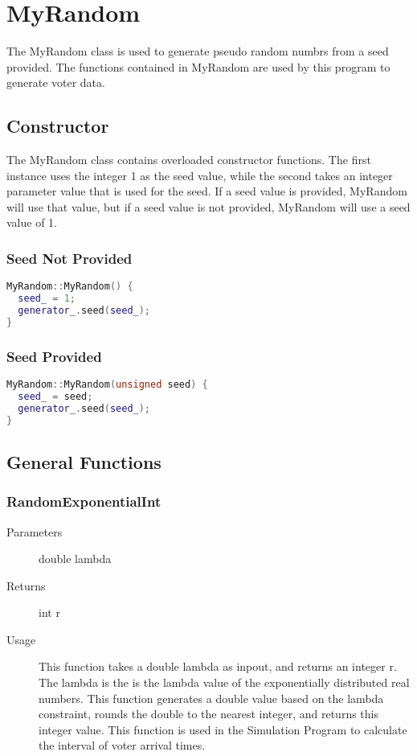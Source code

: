 %


\chapter{MyRandom}
The MyRandom class is used to generate pseudo random numbrs from a seed provided.  The functions contained in MyRandom are used by this program to generate voter data.


\section{Constructor}
The MyRandom class contains overloaded constructor functions. The first instance uses the integer 1 as the seed value, while the second takes an integer parameter value that is used for the seed. 
If a seed value is provided, MyRandom will use that value, but if a seed value is not provided, MyRandom will use a seed value of 1.

\subsection{Seed Not Provided}
\begin{lstlisting}[language=C++]
 MyRandom::MyRandom() {
  seed_ = 1;
  generator_.seed(seed_);
}
\end{lstlisting}

\subsection{Seed Provided}
\begin{lstlisting}[language=C++]
 MyRandom::MyRandom(unsigned seed) {
  seed_ = seed;
  generator_.seed(seed_);
}
\end{lstlisting}
 
\section{General Functions}

\subsection{RandomExponentialInt}
\begin{description}
\item[Parameters] double lambda
\item[Returns] int r
\item[Usage] This function takes a double lambda as inpout, and returns an integer r.  The lambda is the is the lambda value of the exponentially distributed real numbers.  This function generates a double value based on the lambda constraint, rounds the double to the nearest integer, and returns this integer value.
This function is used in the Simulation Program to calculate the interval of voter arrival times.
\end{description}


